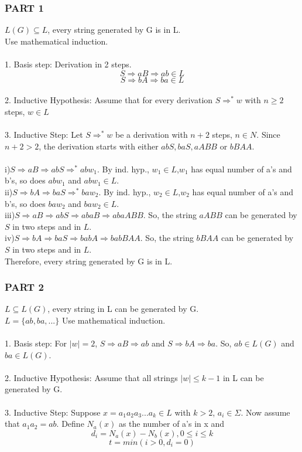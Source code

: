 \documentclass[12pt]{article}
\begin{document}
\subsubsection*{PART 1}
$L(G)\subseteq L$, every string generated by G is in L. \\
Use mathematical induction. \\\\
1. Basis step: Derivation in 2 steps.
$$S\Rightarrow aB\Rightarrow ab \in L$$
$$S\Rightarrow bA\Rightarrow ba \in L$$\\
2. Inductive Hypothesis: Assume that for every derivation $S\Rightarrow^* w$ with $n\geq2$ steps, $w\in L$\\\\
3. Inductive Step: Let $S\Rightarrow^*w$ be a derivation with $n+2$ steps, $n\in N$. Since $n+2> 2$, the derivation starts with either $abS,baS,aABB$ or $bBAA$.\\\\
i)$S\Rightarrow aB\Rightarrow abS \Rightarrow^* abw_1$. By ind. hyp., $w_1\in L$,$w_1$ has equal number of a's and b's, so does $abw_1$ and $abw_1 \in L$.\\
ii)$S\Rightarrow bA\Rightarrow baS \Rightarrow^* baw_2$. By ind. hyp., $w_2\in L$,$w_2$ has equal number of a's and b's, so does $baw_2$ and $baw_2 \in L$.\\
iii)$S\Rightarrow aB\Rightarrow abS \Rightarrow abaB\Rightarrow abaABB$. So, the string $aABB$ can be generated by $S$ in two steps and in $L$. \\
iv)$S\Rightarrow bA\Rightarrow baS \Rightarrow babA\Rightarrow babBAA$. So, the string $bBAA$ can be generated by $S$ in two steps and in $L$. \\
Therefore, every string generated by G is in L.
\subsubsection*{PART 2}
$L\subseteq L(G)$, every string in L can be generated by G. \\
$L=\{ab,ba,...\}$
Use mathematical induction. \\\\
1. Basis step: For $|w|=2$, $S \Rightarrow aB \Rightarrow ab$ and $S \Rightarrow bA \Rightarrow ba$. So, $ab \in L(G)$ and $ba \in L(G)$.\\\\
2. Inductive Hypothesis: Assume that all strings $|w| \leq k-1$ in L can be generated by G.\\\\
3. Inductive Step: Suppose $x=a_1a_2a_3...a_k \in L$ with $k>2$, $a_i\in \Sigma$. Now assume that $a_1a_2=ab$. Define $N_a(x)$ as the number of a's in x and 
$$d_i=N_a(x)-N_b(x), 0\leq i \leq k$$
$$t=min(i>0, d_i=0)$$
\end{document}
